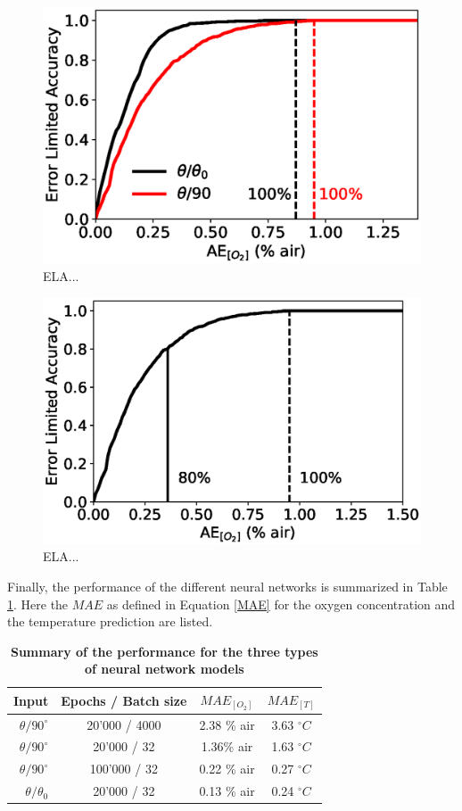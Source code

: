 \documentclass[9pt,twocolumn,twoside,pdftex]{optica}
\begin{document}
\begin{figure}[htbp]
\centering
\includegraphics[width=7 cm]{ELA_comparison.eps}
\caption{ELA...}
\label{fig:result_theta0}
\end{figure}

\begin{figure}[htbp]
\centering
\includegraphics[width=7 cm]{ELA_model_100001_32_1e-3_3x50_2x5_2x5_theta90.eps}
\caption{ELA...}
\label{fig:result_theta0}
\end{figure}




Finally, the performance of the different neural networks is summarized in Table \ref{TableMAE_summary}. Here the $MAE$ as defined in Equation \ref{MAE} for the oxygen concentration and the temperature prediction are listed.

\begin{table}[hbt]
\centering
\caption {\bf Summary of the performance for the three types of neural network models}

\begin{tabular}{ rccc}
\smallskip 
 Input & Epochs / Batch size & $MAE_{[O_2]}$ & $MAE_{[T]}$  \\ 
 \hline
$\theta / 90^\circ$ & 20'000 / 4000 & 2.38 \% air & 3.63 $^\circ C$\\ 
$\theta / 90^\circ$ & 20'000 / 32 & 1.36\% air & 1.63 $^\circ C$\\ 
$\theta / 90^\circ$& 100'000 / 32 & 0.22 \% air & 0.27 $^\circ C$\\ 
$\theta /\theta_0$ & 20'000 / 32 & 0.13 \% air & 0.24 $^\circ C$\\ 

\end{tabular}
\label{TableMAE_summary}
\end{table}
\end{document}
